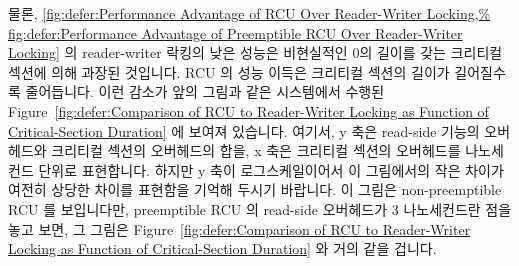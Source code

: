 물론,
\cref{fig:defer:Performance Advantage of RCU Over Reader-Writer Locking,%
fig:defer:Performance Advantage of Preemptible RCU Over Reader-Writer Locking}
의 reader-writer 락킹의 낮은 성능은 비현실적인 0의 길이를 갖는 크리티컬 섹션에
의해 과장된 것입니다.
RCU 의 성능 이득은 크리티컬 섹션의 길이가 길어질수록 줄어듭니다.
이런 감소가 앞의 그림과 같은 시스템에서 수행된
Figure~\ref{fig:defer:Comparison of RCU to Reader-Writer Locking as Function of Critical-Section Duration}
에 보여져 있습니다.
여기서, y 축은 read-side 기능의 오버헤드와 크리티컬 섹션의 오버헤드의 합을, x
축은 크리티컬 섹션의 오버헤드를 나노세컨드 단위로 표현합니다.
하지만 y 축이 로그스케일이어서 이 그림에서의 작은 차이가 여전히 상당한 차이를
표현함을 기억해 두시기 바랍니다.
이 그림은 non-preemptible RCU 를 보입니다만, preemptible RCU 의 read-side
오버헤드가 3 나노세컨드란 점을 놓고 보면, 그 그림은
Figure~\ref{fig:defer:Comparison of RCU to Reader-Writer Locking as Function of Critical-Section Duration}
와 거의 같을 겁니다.

